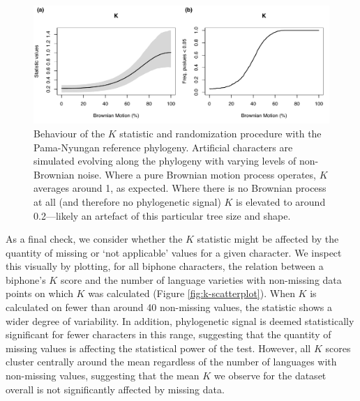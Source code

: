 \begin{figure}

{\centering \includegraphics[width=0.9\linewidth]{fig/phylosim} 

}

\caption{Behaviour of the $K$ statistic and randomization procedure with the Pama-Nyungan reference phylogeny. Artificial characters are simulated evolving along the phylogeny with varying levels of non-Brownian noise. Where a pure Brownian motion process operates, $K$ averages around 1, as expected. Where there is no Brownian process at all (and therefore no phylogenetic signal) $K$ is elevated to around 0.2---likely an artefact of this particular tree size and shape.}\label{fig:k-simulation-plots}
\end{figure}

As a final check, we consider whether the \(K\) statistic might be affected by the quantity of missing or `not applicable' values for a given character. We inspect this visually by plotting, for all biphone characters, the relation between a biphone's \(K\) score and the number of language varieties with non-missing data points on which \(K\) was calculated (Figure \ref{fig:k-scatterplot}). When \(K\) is calculated on fewer than around 40 non-missing values, the statistic shows a wider degree of variability. In addition, phylogenetic signal is deemed statistically significant for fewer characters in this range, suggesting that the quantity of missing values is affecting the statistical power of the test. However, all \(K\) scores cluster centrally around the mean regardless of the number of languages with non-missing values, suggesting that the mean \(K\) we observe for the dataset overall is not significantly affected by missing data.

